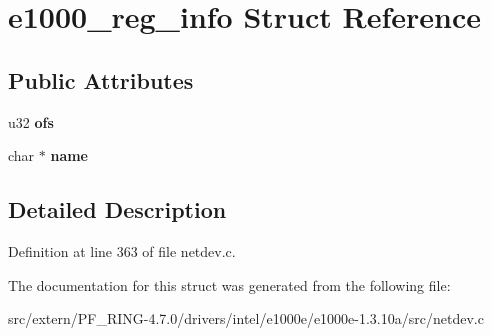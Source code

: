 \hypertarget{structe1000__reg__info}{
\section{e1000\_\-reg\_\-info Struct Reference}
\label{structe1000__reg__info}
}
\subsection*{Public Attributes}
\begin{DoxyCompactItemize}
\item 
\hypertarget{structe1000__reg__info_a60776dae01ed1f75a052c348b5c4e04c}{
u32 {\bfseries ofs}}
\label{structe1000__reg__info_a60776dae01ed1f75a052c348b5c4e04c}

\item 
\hypertarget{structe1000__reg__info_ae289895912927484b688b41bf7f03f37}{
char $\ast$ {\bfseries name}}
\label{structe1000__reg__info_ae289895912927484b688b41bf7f03f37}

\end{DoxyCompactItemize}


\subsection{Detailed Description}


Definition at line 363 of file netdev.c.



The documentation for this struct was generated from the following file:\begin{DoxyCompactItemize}
\item 
src/extern/PF\_\-RING-\/4.7.0/drivers/intel/e1000e/e1000e-\/1.3.10a/src/netdev.c\end{DoxyCompactItemize}
